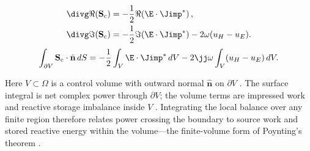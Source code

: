 \begin{equation}
\label{eq:ch1.poynting-real-imag-split}
\begin{aligned}
\divg\Re(\mathbf{S}_\mathrm{c})&=-\frac12\Re\!\left(\E\cdot\Jimp^*\right),\\
\divg\Im(\mathbf{S}_\mathrm{c})&=-\frac12\Im\!\left(\E\cdot\Jimp^*\right)-2\omega(u_H-u_E).
\end{aligned}
\end{equation}
\begin{equation}
\label{eq:ch1.dual-invariant-energy}\int_{\partial V}\mathbf{S}_\mathrm{c}\cdot\hat{\mathbf{n}}\,dS
=-\frac12\int_V\E\cdot\Jimp^*\,dV
-2\jj\omega\int_V(u_H-u_E)\,dV.
\end{equation}
\addtocounter{equation}{-1}\label{eq:ch1.power-balance-integral}%
Here $V\subset\Omega$ is a control volume with outward normal $\hat{\mathbf{n}}$ on $\partial V$ \cite{stratton1941}. The surface integral is net complex power through $\partial V$; the volume terms are impressed work and reactive storage imbalance inside $V$ \cite{poynting1884}. Integrating the local balance over any finite region therefore relates power crossing the boundary to source work and stored reactive energy within the volume---the finite-volume form of Poynting's theorem \cite{stratton1941}.

